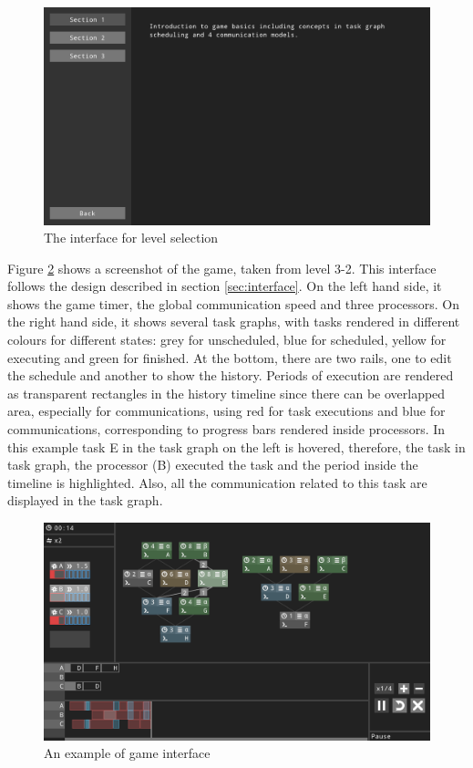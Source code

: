 \documentclass[msc,deptreport, cs]{infthesis}
\begin{document}
\begin{figure}[!htb]
  \centering
  \includegraphics[width=\columnwidth]{play2.png}
  \caption{The interface for level selection}
  \label{fig:play2}
\end{figure}

Figure \ref{fig:play1} shows a screenshot of the game, taken from level 3-2. This interface follows the design described in section \ref{sec:interface}. On the left hand side, it shows the game timer, the global communication speed and three processors. On the right hand side, it shows several task graphs, with tasks rendered in different colours for different states: grey for unscheduled, blue for scheduled, yellow for executing and green for finished. At the bottom, there are two rails, one to edit the schedule and another to show the history. Periods of execution are rendered as transparent rectangles in the history timeline since there can be overlapped area, especially for communications, using red for task executions and blue for communications, corresponding to progress bars rendered inside processors. In this example task E in the task graph on the left is hovered, therefore, the task in task graph, the processor (B) executed the task and the period inside the timeline is highlighted. Also, all the communication related to this task are displayed in the task graph.

\begin{figure}[!htb]
  \centering
  \includegraphics[width=\columnwidth]{play1.png}
  \caption{An example of game interface}
  \label{fig:play1}
\end{figure}
\end{document}
